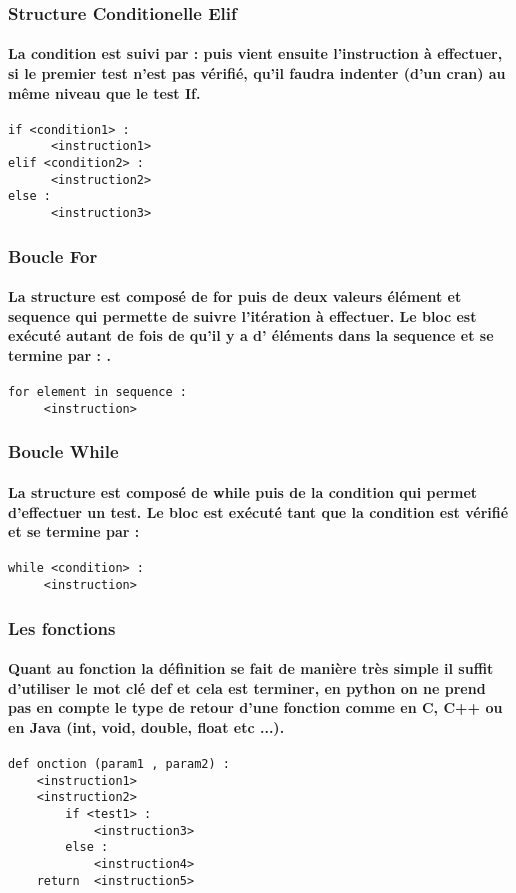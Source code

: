 \documentclass[a4paper, 12pt, twoside]{article}
\begin{document}
\subsubsection{ Structure Conditionelle Elif }
\paragraph{La condition est suivi par  :  puis vient ensuite l'instruction à effectuer, si le premier test n'est pas vérifié, qu'il faudra indenter (d'un cran) au même niveau que le test If.}
\begin{verbatim}
if <condition1> :
      <instruction1>
elif <condition2> :
      <instruction2>
else : 
      <instruction3>
\end{verbatim}
\subsubsection{ Boucle For}
\paragraph{La structure est composé de for puis de deux valeurs élément et sequence qui permette de suivre l'itération à effectuer. Le bloc 
est exécuté autant de fois de qu'il y a d' éléments dans la sequence et se termine par  : .}
\begin{verbatim}
for element in sequence :
     <instruction>
\end{verbatim}
\subsubsection{ Boucle While }
\paragraph{La structure est composé de while puis de la condition qui permet d'effectuer un test. Le bloc est exécuté tant que la condition est vérifié et se termine par  : }
\begin{verbatim}
while <condition> :
     <instruction>
\end{verbatim}
\subsubsection{ Les fonctions}
\paragraph{Quant au fonction la définition se fait de manière très simple il suffit d'utiliser le mot clé def et cela est terminer, en python on ne prend pas en compte le type de retour d'une fonction comme en C, C++ ou en Java (int, void, double, float etc ...).}
\begin{verbatim}
def onction (param1 , param2) :
    <instruction1>
    <instruction2>
        if <test1> :
            <instruction3>
        else :
            <instruction4>
    return  <instruction5>
\end{verbatim}
\end{document}
